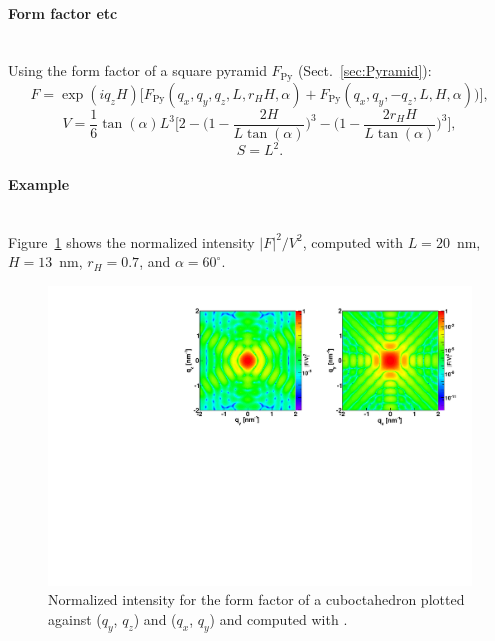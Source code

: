 \paragraph{Form factor etc}\strut\\
Using the form factor of a square pyramid $F_\text{Py}$
(Sect.~\ref{sec:Pyramid}):
\begin{equation*}
F=\exp(iq_zH)\Big[F_\text{Py}(q_x,q_y, q_z, L, r_H H,\alpha)
                 +F_\text{Py}(q_x, q_y, -q_z, L, H, \alpha))\Big],
\end{equation*}
\begin{equation*}
  V= \dfrac{1}{6} \tan(\alpha)L^3 \Big[ 2
         - \Big(1 - \dfrac{2H }{L\tan(\alpha)} \Big)^3
           - \Big(1 - \dfrac{2 r_H
             H}{L\tan(\alpha) }\Big)^3\Big],
\end{equation*}
\begin{equation*}
  S =L^2.
\end{equation*}

\paragraph{Example}\strut\\
Figure~\ref{fig:FFcuboctahEx} shows the normalized intensity $|F|^2/V^2$, computed with $L=20$~nm, $H=13$~nm, $r_H=0.7$, and $\alpha=60^{\circ}$.
\begin{figure}[h]
\begin{center}
\includegraphics[angle=-90,width=\textwidth]{fig/ff/figffcuboctah.pdf}
\end{center}
\caption{Normalized intensity for the form factor of a cuboctahedron plotted against ($q_y$, $q_z$) and  ($q_x$, $q_y$) and computed with .}
\label{fig:FFcuboctahEx}
\end{figure}


